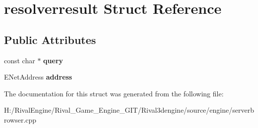 \hypertarget{structresolverresult}{}\section{resolverresult Struct Reference}
\label{structresolverresult}
\subsection*{Public Attributes}
\begin{DoxyCompactItemize}
\item 
\mbox{\label{structresolverresult_ae6e79fe3f0b3dfc6352dbbb6b447ad80}} 
const char $\ast$ {\bfseries query}
\item 
\mbox{\label{structresolverresult_a7a6738b14b47eef3e8a7517009a39a5e}} 
E\+Net\+Address {\bfseries address}
\end{DoxyCompactItemize}


The documentation for this struct was generated from the following file\+:\begin{DoxyCompactItemize}
\item 
H\+:/\+Rival\+Engine/\+Rival\+\_\+\+Game\+\_\+\+Engine\+\_\+\+G\+I\+T/\+Rival3dengine/source/engine/serverbrowser.\+cpp\end{DoxyCompactItemize}
